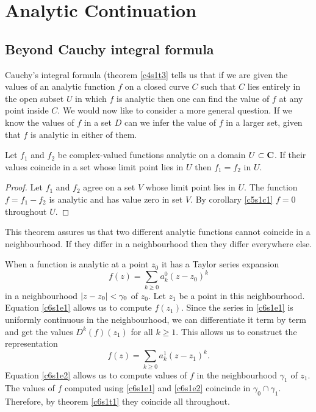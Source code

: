 \chapter{Analytic Continuation}\label{c6}
\section{Beyond Cauchy integral formula}\label{c6s1}
Cauchy's integral formula (theorem \ref{c4s1t3} tells us that if we are given the
values of an analytic function $f$ on a closed curve $C$ such that $C$ lies 
entirely in the open subset $U$ in which $f$ is analytic then one can find the 
value of $f$ at any point inside $C$. We would now like to consider a more general
question. If we know the values of $f$ in a set $D$ can we infer the value of $f$
in a larger set, given that $f$ is analytic in either of them.

\begin{thm}\label{c6s1t1}
Let $f_1$ and $f_2$ be complex-valued functions analytic on a domain $U \subset \mathbf{C}$.
If their values coincide in a set whose limit point lies in $U$ then $f_1 = f_2$ in 
$U$.
\end{thm}
\begin{proof}
Let $f_1$ and $f_2$ agree on a set $V$ whose limit point lies in $U$. The function 
$f = f_1 - f_2$ is analytic and has value zero in set $V$. By corollary \ref{c5s1c1}
$f = 0$ throughout $U$.
\end{proof}

This theorem assures us that two different analytic functions cannot coincide in a
neighbourhood. If they differ in a neighbourhood then they differ everywhere else.

When a function is analytic at a point $z_0$ it has a Taylor series expansion
\begin{equation}\label{c6s1e1}
f(z) = \sum_{k \ge 0}a_k^0(z - z_0)^k
\end{equation}
in a neighbourhood $\left\vert{z - z_0}\right\vert < \gamma_0$ of $z_0$. Let $z_1$ be a point in
this neighbourhood. Equation \eqref{c6s1e1} allows us to compute $f(z_1)$. Since
the series in \eqref{c6s1e1} is uniformly continuous in the neighbourhood, we can
differentiate it term by term and get the values $D^k(f)(z_1)$ for all $k \ge 1$.
This allows us to construct the representation
\begin{equation}\label{c6s1e2}
f(z) = \sum_{k \ge 0}a_k^1(z - z_1)^k.
\end{equation}
Equation \eqref{c6s1e2} allows us to compute values of $f$ in the neighbourhood
$\gamma_1$ of $z_1$. The values of $f$ computed using \eqref{c6s1e1} and 
\eqref{c6s1e2} coincinde in $\gamma_0 \cap \gamma_1$. Therefore, by theorem 
\ref{c6s1t1} they coincide all throughout. 

